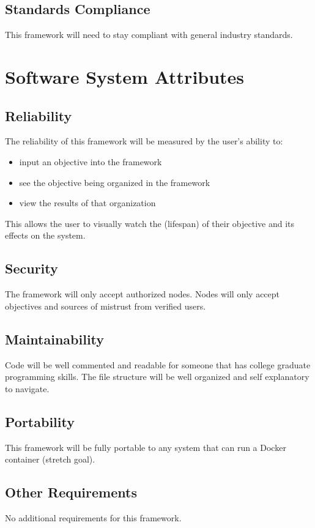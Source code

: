 \documentclass[draftclsnofoot, onecolumn, compsoc, 10pt]{IEEEtran}
\begin{document}
\subsection{Standards Compliance}
This framework will need to stay compliant with general industry standards.



\section{Software System Attributes}
\subsection{Reliability}
The reliability of this framework will be measured by the user's ability to:
\begin{itemize}
\item input an objective into the framework
\item see the objective being organized in the framework
\item view the results of that organization
\end{itemize} 
This allows the user to visually watch the (lifespan) of their objective and its effects on the system.


\subsection{Security}

The framework will only accept authorized nodes. Nodes will only accept objectives and sources of mistrust from verified users.

\subsection{Maintainability}

Code will be well commented and readable for someone that has college graduate programming skills. The file structure will be well organized and self explanatory to navigate. 

\subsection{Portability}
This framework will be fully portable to any system that can run a Docker container (stretch goal). 

\subsection{Other Requirements}
No additional requirements for this framework.
\end{document}
